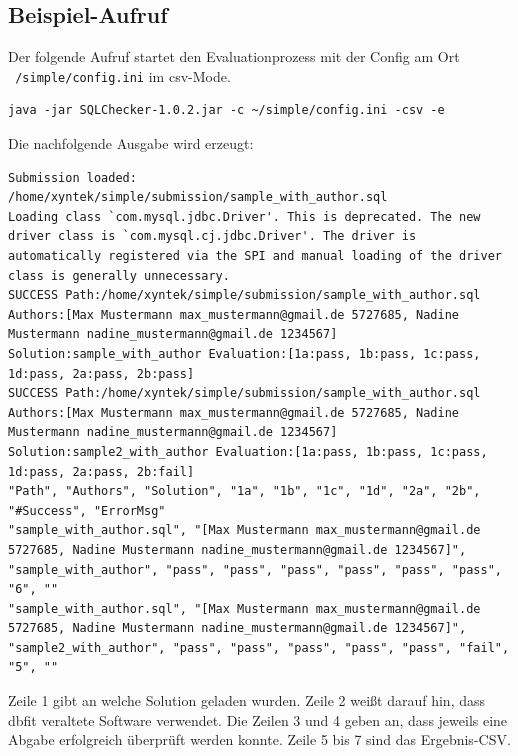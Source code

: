 \documentclass[11pt]{article}
\begin{document}
\subsection{Beispiel-Aufruf}
Der folgende Aufruf startet den Evaluationprozess mit der Config am Ort \texttt{~/simple/config.ini} im csv-Mode.
\begin{verbatim}
java -jar SQLChecker-1.0.2.jar -c ~/simple/config.ini -csv -e
\end{verbatim}
Die nachfolgende Ausgabe wird erzeugt:
\begin{verbatim}
Submission loaded: /home/xyntek/simple/submission/sample_with_author.sql
Loading class `com.mysql.jdbc.Driver'. This is deprecated. The new driver class is `com.mysql.cj.jdbc.Driver'. The driver is automatically registered via the SPI and manual loading of the driver class is generally unnecessary.
SUCCESS Path:/home/xyntek/simple/submission/sample_with_author.sql Authors:[Max Mustermann max_mustermann@gmail.de 5727685, Nadine Mustermann nadine_mustermann@gmail.de 1234567] Solution:sample_with_author Evaluation:[1a:pass, 1b:pass, 1c:pass, 1d:pass, 2a:pass, 2b:pass]
SUCCESS Path:/home/xyntek/simple/submission/sample_with_author.sql Authors:[Max Mustermann max_mustermann@gmail.de 5727685, Nadine Mustermann nadine_mustermann@gmail.de 1234567] Solution:sample2_with_author Evaluation:[1a:pass, 1b:pass, 1c:pass, 1d:pass, 2a:pass, 2b:fail]
"Path", "Authors", "Solution", "1a", "1b", "1c", "1d", "2a", "2b", "#Success", "ErrorMsg"
"sample_with_author.sql", "[Max Mustermann max_mustermann@gmail.de 5727685, Nadine Mustermann nadine_mustermann@gmail.de 1234567]", "sample_with_author", "pass", "pass", "pass", "pass", "pass", "pass", "6", ""
"sample_with_author.sql", "[Max Mustermann max_mustermann@gmail.de 5727685, Nadine Mustermann nadine_mustermann@gmail.de 1234567]", "sample2_with_author", "pass", "pass", "pass", "pass", "pass", "fail", "5", ""
\end{verbatim}
Zeile 1 gibt an welche Solution geladen wurden. Zeile 2 weißt darauf hin, dass dbfit veraltete Software verwendet. Die Zeilen 3 und 4 geben an, dass jeweils eine Abgabe erfolgreich überprüft werden konnte. Zeile 5 bis 7 sind das Ergebnis-CSV.
\end{document}
